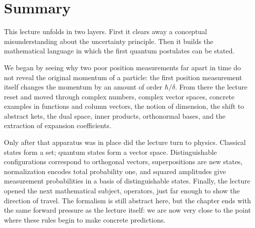 \section{Summary}

This lecture unfolds in two layers. First it clears away a conceptual misunderstanding about the uncertainty principle. Then it builds the mathematical language in which the first quantum postulates can be stated.

We began by seeing why two poor position measurements far apart in time do not reveal the original momentum of a particle: the first position measurement itself changes the momentum by an amount of order \(\hbar/\delta\). From there the lecture reset and moved through complex numbers, complex vector spaces, concrete examples in functions and column vectors, the notion of dimension, the shift to abstract kets, the dual space, inner products, orthonormal bases, and the extraction of expansion coefficients.

Only after that apparatus was in place did the lecture turn to physics. Classical states form a set; quantum states form a vector space. Distinguishable configurations correspond to orthogonal vectors, superpositions are new states, normalization encodes total probability one, and squared amplitudes give measurement probabilities in a basis of distinguishable states. Finally, the lecture opened the next mathematical subject, operators, just far enough to show the direction of travel. The formalism is still abstract here, but the chapter ends with the same forward pressure as the lecture itself: we are now very close to the point where these rules begin to make concrete predictions.
